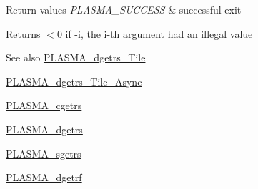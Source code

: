 \begin{DoxyRetVals}{Return values}
{\em P\+L\+A\+S\+M\+A\+\_\+\+S\+U\+C\+C\+E\+S\+S} & successful exit \\
\hline
\end{DoxyRetVals}
\begin{DoxyReturn}{Returns}
$<$0 if -\/i, the i-\/th argument had an illegal value
\end{DoxyReturn}
\begin{DoxySeeAlso}{See also}
\hyperlink{group__double__Tile_gaa05de453eb3dfe9851d763434948577a_gaa05de453eb3dfe9851d763434948577a}{P\+L\+A\+S\+M\+A\+\_\+dgetrs\+\_\+\+Tile} 

\hyperlink{group__double__Tile__Async_ga0961e66f8d5a365d6cb5168d79352d38_ga0961e66f8d5a365d6cb5168d79352d38}{P\+L\+A\+S\+M\+A\+\_\+dgetrs\+\_\+\+Tile\+\_\+\+Async} 

\hyperlink{group__PLASMA__Complex32__t_ga898ea98a3d182865980c7393dfca2c27_ga898ea98a3d182865980c7393dfca2c27}{P\+L\+A\+S\+M\+A\+\_\+cgetrs} 

\hyperlink{group__double_gaff3c22db4affbede58e22311320a2b85_gaff3c22db4affbede58e22311320a2b85}{P\+L\+A\+S\+M\+A\+\_\+dgetrs} 

\hyperlink{group__float_ga655cb742ac1c78e5ce86070f4ce1271b_ga655cb742ac1c78e5ce86070f4ce1271b}{P\+L\+A\+S\+M\+A\+\_\+sgetrs} 

\hyperlink{group__double_gaa626e37ec710bfb5c98fef7b00511ea8_gaa626e37ec710bfb5c98fef7b00511ea8}{P\+L\+A\+S\+M\+A\+\_\+dgetrf} 
\end{DoxySeeAlso}
\hypertarget{group__double_ga39d27f0353921e5b63e0fdc9cca4b19c_ga39d27f0353921e5b63e0fdc9cca4b19c}{}

